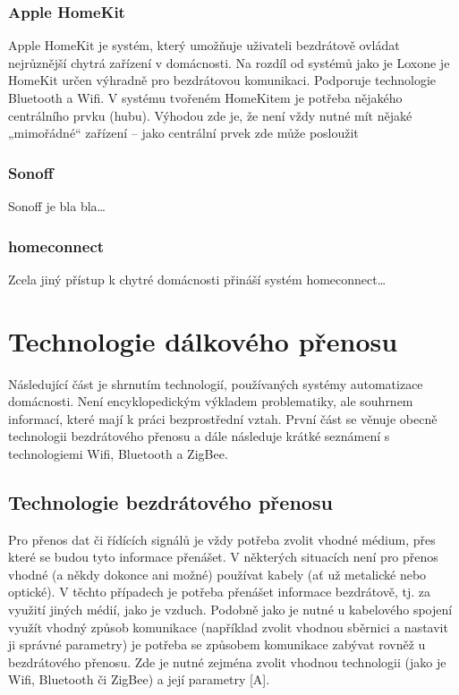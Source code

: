 \subsection*{Apple HomeKit}
Apple HomeKit je systém, který umožňuje uživateli bezdrátově ovládat nejrůznější chytrá zařízení v domácnosti. Na rozdíl od systémů jako je Loxone je HomeKit určen výhradně pro bezdrátovou komunikaci. Podporuje technologie Bluetooth a Wifi. V systému tvořeném HomeKitem je potřeba nějakého centrálního prvku (hubu). Výhodou zde je, že není vždy nutné mít nějaké „mimořádné“ zařízení – jako centrální prvek zde může posloužit 


\subsection*{Sonoff}
Sonoff je bla bla…


\subsection*{homeconnect}

Zcela jiný přístup k chytré domácnosti přináší systém homeconnect…
\newpage

\chapter{Technologie dálkového přenosu}
Následující část je shrnutím technologií, používaných systémy automatizace domácnosti. Není encyklopedickým výkladem problematiky, ale souhrnem informací, které mají k práci bezprostřední vztah. První část se věnuje obecně technologii bezdrátového přenosu a dále následuje krátké seznámení s technologiemi Wifi, Bluetooth a ZigBee.

\section{Technologie bezdrátového přenosu}
Pro přenos dat či řídících signálů je vždy potřeba zvolit vhodné médium, přes které se budou tyto informace přenášet. V některých situacích není pro přenos vhodné (a někdy dokonce ani možné) používat kabely (ať už metalické nebo optické). V těchto případech je potřeba přenášet informace bezdrátově, tj. za využití jiných médií, jako je vzduch. 
Podobně jako je nutné u kabelového spojení využít vhodný způsob komunikace (například zvolit vhodnou sběrnici a nastavit ji správné parametry) je potřeba se způsobem komunikace zabývat rovněž u bezdrátového přenosu. Zde je nutné zejména zvolit vhodnou technologii (jako je Wifi, Bluetooth či ZigBee) a její parametry [A].

